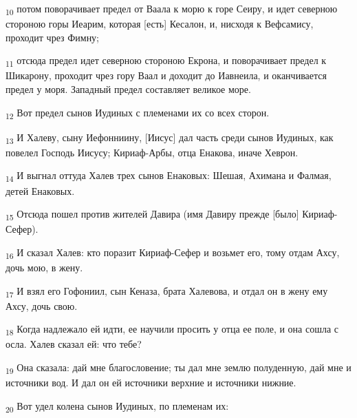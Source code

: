 \begin{tcolorbox}
\textsubscript{10} потом поворачивает предел от Ваала к морю к горе Сеиру, и идет северною стороною горы Иеарим, которая [есть] Кесалон, и, нисходя к Вефсамису, проходит чрез Фимну;
\end{tcolorbox}
\begin{tcolorbox}
\textsubscript{11} отсюда предел идет северною стороною Екрона, и поворачивает предел к Шикарону, проходит чрез гору Ваал и доходит до Иавнеила, и оканчивается предел у моря. Западный предел составляет великое море.
\end{tcolorbox}
\begin{tcolorbox}
\textsubscript{12} Вот предел сынов Иудиных с племенами их со всех сторон.
\end{tcolorbox}
\begin{tcolorbox}
\textsubscript{13} И Халеву, сыну Иефонниину, [Иисус] дал часть среди сынов Иудиных, как повелел Господь Иисусу; Кириаф-Арбы, отца Енакова, иначе Хеврон.
\end{tcolorbox}
\begin{tcolorbox}
\textsubscript{14} И выгнал оттуда Халев трех сынов Енаковых: Шешая, Ахимана и Фалмая, детей Енаковых.
\end{tcolorbox}
\begin{tcolorbox}
\textsubscript{15} Отсюда пошел против жителей Давира (имя Давиру прежде [было] Кириаф-Сефер).
\end{tcolorbox}
\begin{tcolorbox}
\textsubscript{16} И сказал Халев: кто поразит Кириаф-Сефер и возьмет его, тому отдам Ахсу, дочь мою, в жену.
\end{tcolorbox}
\begin{tcolorbox}
\textsubscript{17} И взял его Гофониил, сын Кеназа, брата Халевова, и отдал он в жену ему Ахсу, дочь свою.
\end{tcolorbox}
\begin{tcolorbox}
\textsubscript{18} Когда надлежало ей идти, ее научили просить у отца ее поле, и она сошла с осла. Халев сказал ей: что тебе?
\end{tcolorbox}
\begin{tcolorbox}
\textsubscript{19} Она сказала: дай мне благословение; ты дал мне землю полуденную, дай мне и источники вод. И дал он ей источники верхние и источники нижние.
\end{tcolorbox}
\begin{tcolorbox}
\textsubscript{20} Вот удел колена сынов Иудиных, по племенам их:
\end{tcolorbox}
